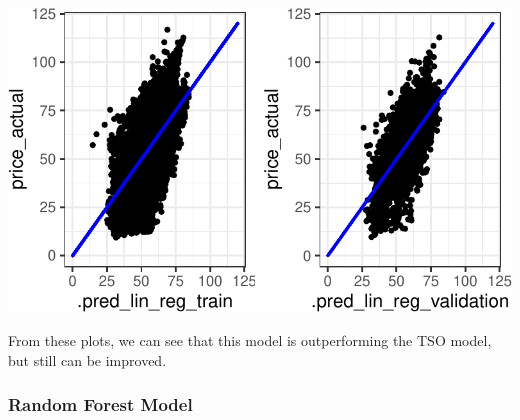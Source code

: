 \documentclass[
]{article}
\begin{document}
\includegraphics{Analytics_Report_files/figure-pdf/plotLinReg-1.pdf}

From these plots, we can see that this model is outperforming the TSO
model, but still can be improved.

\subsubsection{Random Forest Model}\label{random-forest-model}
\end{document}
